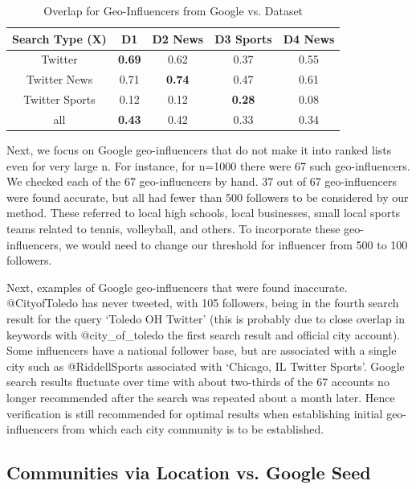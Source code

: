 \begin{table}
\small
\renewcommand{\arraystretch}{1.2}
\caption{Overlap for Geo-Influencers from Google vs. Dataset}
\label{table_ch3_2}
\centering
\begin{tabular}{|c|c|c|c|c|}
\hline
\bfseries Search Type (X) & \bfseries D1 & \bfseries D2 News & \bfseries D3 Sports & \bfseries D4 News \\
\hline
Twitter&\bfseries 0.69&0.62&0.37&0.55\\
\hline
Twitter News&0.71&\bfseries 0.74&0.47&0.61\\
\hline
Twitter Sports&0.12&0.12&\bfseries 0.28&0.08\\
\hline
all&\bfseries 0.43&0.42&0.33&0.34\\
\hline
\end{tabular}
\end{table}

Next, we focus on Google geo-influencers that do not make it into ranked lists even for very large n. For instance, for n=1000 there were 67 such geo-influencers. We checked each of the 67 geo-influencers by hand. 37 out of 67 geo-influencers were found accurate, but all had fewer than 500 followers to be considered by our method. These referred to local high schools, local businesses, small local sports teams related to tennis, volleyball, and others. To incorporate these geo-influencers, we would need to change our threshold for influencer from 500 to 100 followers.

Next, examples of Google geo-influencers that were found inaccurate. @CityofToledo has never tweeted, with 105 followers, being in the fourth search result for the query `Toledo OH Twitter' (this is probably due to close overlap in keywords with @city\_of\_toledo the first search result and official city account). Some influencers have a national follower base, but are associated with a single city such as @RiddellSports associated with `Chicago, IL Twitter Sports'. Google search results fluctuate over time with about two-thirds of the 67 accounts no longer recommended after the search was repeated about a month later. Hence verification is still recommended for optimal results when establishing initial geo-influencers from which each city community is to be established.

\subsection{Communities via Location vs. Google Seed}

